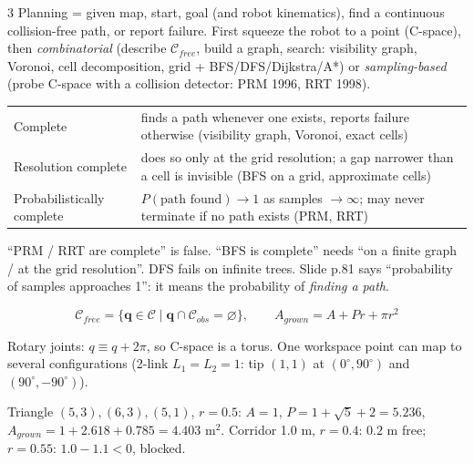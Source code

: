 \begin{multicols}{3}
Planning = given map, start, goal (and robot kinematics), find a continuous collision-free path, or report failure. First squeeze the robot to a point (C-space), then \emph{combinatorial} (describe $\mathcal C_{free}$, build a graph, search: visibility graph, Voronoi, cell decomposition, grid + BFS/DFS/Dijkstra/A*) or \emph{sampling-based} (probe C-space with a collision detector: PRM 1996, RRT 1998).
\begin{tabularx}{\linewidth}{@{}lX@{}}\toprule
Complete & finds a path whenever one exists, reports failure otherwise (visibility graph, Voronoi, exact cells)\\
Resolution complete & does so only at the grid resolution; a gap narrower than a cell is invisible (BFS on a grid, approximate cells)\\
Probabilistically complete & $P(\text{path found})\to1$ as samples $\to\infty$; may never terminate if no path exists (PRM, RRT)\\\bottomrule
\end{tabularx}
\begin{trap}
``PRM / RRT are complete'' is false. ``BFS is complete'' needs ``on a finite graph / at the grid resolution''. DFS fails on infinite trees. Slide p.81 says ``probability of samples approaches 1'': it means the probability of \emph{finding a path}.
\end{trap}

\begin{fbx}
\[\mathcal C_{free}=\{\mathbf q\in\mathcal C\mid\mathbf q\cap\mathcal C_{obs}=\varnothing\},\qquad A_{grown}=A+Pr+\pi r^2\]
\end{fbx}
Rotary joints: $q\equiv q+2\pi$, so C-space is a torus. One workspace point can map to several configurations (2-link $L_1=L_2=1$: tip $(1,1)$ at $(0^\circ,90^\circ)$ and $(90^\circ,-90^\circ)$).
\begin{worked}
Triangle $(5,3),(6,3),(5,1)$, $r=0.5$: $A=1$, $P=1+\sqrt5+2=5.236$, $A_{grown}=1+2.618+0.785=4.403$ m$^2$. Corridor 1.0 m, $r=0.4$: $0.2$ m free; $r=0.55$: $1.0-1.1<0$, blocked. \chk
\end{worked}


\end{multicols}
